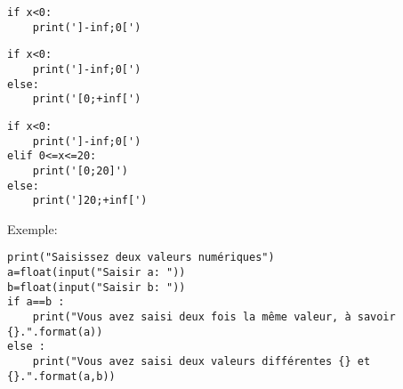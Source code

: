\documentclass[10pt,dvipsnames,  dvips]{article}
\begin{document}

\hspace{-0.5cm}
\begin{minipage}[t]{5.6cm}
\begin{lstlisting}
if x<0:
	print(']-inf;0[')
\end{lstlisting}
\end{minipage}
\hspace{0.1cm}
\begin{minipage}[t]{6cm}
\begin{lstlisting}
if x<0:
	print(']-inf;0[')
else:
	print('[0;+inf[')
\end{lstlisting}
\end{minipage}
\hspace{0.1cm}
\begin{minipage}[t]{6.7cm}
\begin{lstlisting}
if x<0:
	print(']-inf;0[')
elif 0<=x<=20:
	print('[0;20]')
else:
	print(']20;+inf[')
\end{lstlisting}
\end{minipage}

Exemple:\\
\begin{lstlisting}
print("Saisissez deux valeurs numériques")
a=float(input("Saisir a: "))
b=float(input("Saisir b: "))
if a==b :
	print("Vous avez saisi deux fois la même valeur, à savoir {}.".format(a))
else :
	print("Vous avez saisi deux valeurs différentes {} et {}.".format(a,b))
\end{lstlisting}
\end{document}
